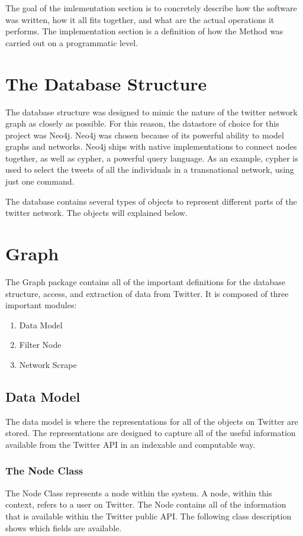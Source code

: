 The goal of the imlementation section is to concretely describe how
the software was written, how it all fits together, and what are the
actual operations it performs. The implementation section is a
definition of how the Method was carried out on a programmatic level.

\section{The Database Structure}
The database structure was designed to mimic the nature of the twitter
network graph as closely as possible. For this reason, the datastore
of choice for this project was Neo4j. Neo4j was chosen because of its
powerful ability to model graphs and networks. Neo4j ships with native
implementations to connect nodes together, as well as cypher, a
powerful query language. As an example, cypher is used to select the
tweets of all the individuals in a transnational network, using just
one command.

The database contains several types of objects to represent different
parts of the twitter network. The objects will explained below.

\section{Graph}
The Graph package contains all of the important definitions for the
database structure, access, and extraction of data from Twitter. It is
composed of three important modules:

\begin{enumerate}
\item Data Model
\item Filter Node
\item Network Scrape
\end{enumerate}

\subsection{Data Model}
The data model is where the representations for all of the objects on
Twitter are stored. The representations are designed to capture all of
the useful information available from the Twitter API in an indexable
and computable way.

\subsubsection{The Node Class}
The Node Class represents a node within the system. A node, within
this context, refers to a user on Twitter. The Node contains all of
the information that is available within the Twitter public API. The
following class description shows which fields are available.


